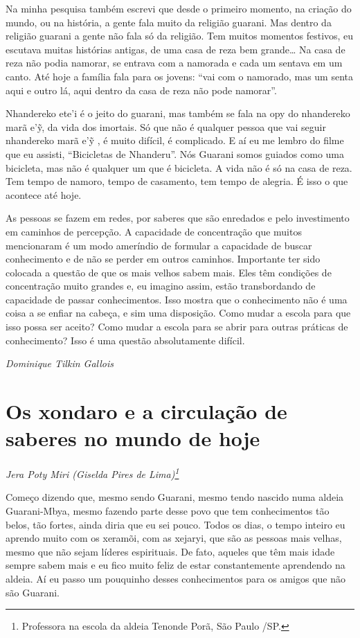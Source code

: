 Na minha pesquisa também escrevi que desde o primeiro momento, na
criação do mundo, ou na história, a gente fala muito da religião
guarani. Mas dentro da religião guarani a gente não fala só da
religião. Tem muitos momentos festivos, eu escutava muitas histórias
antigas, de uma casa de reza bem grande\ldots{} Na casa de reza não podia
namorar, se entrava com a namorada e cada um sentava em um canto. Até
hoje a família fala para os jovens: ``vai com o namorado, mas um senta
aqui e outro lá, aqui dentro da casa de reza não pode namorar''.

Nhandereko ete’i é o jeito do guarani, mas também se fala na opy do
nhandereko marã e’\~{y}, da vida dos imortais. Só que não é qualquer
pessoa que vai seguir nhandereko marã e’\~{y} , é muito difícil, é
complicado. E aí eu me lembro do filme que eu assisti, ``Bicicletas de
Nhanderu''. Nós Guarani somos guiados como uma bicicleta, mas não é
qualquer um que é bicicleta. A vida não é só na casa de reza. Tem tempo
de namoro, tempo de casamento, tem tempo de alegria. É isso o que
acontece até hoje.

As pessoas se fazem em redes, por saberes que são enredados e pelo
investimento em caminhos de percepção. A capacidade de concentração que
muitos mencionaram é um modo ameríndio de formular a capacidade de
buscar conhecimento e de não se perder em outros caminhos. Importante
ter sido colocada a questão de que os mais velhos sabem mais. Eles têm
condições de concentração muito grandes e, eu imagino assim, estão
transbordando de capacidade de passar conhecimentos. Isso mostra que o
conhecimento não é uma coisa a se enfiar na cabeça, e sim uma
disposição. Como mudar a escola para que isso possa ser aceito? Como
mudar a escola para se abrir para outras práticas de conhecimento? Isso
é uma questão absolutamente difícil.
\bigskip
\begin{flushright}
\emph{Dominique Tilkin Gallois}
\end{flushright}


\chapter{Os xondaro e a circulação de saberes no mundo de hoje}
\begin{flushright}
\emph{Jera Poty Miri (Giselda Pires de Lima)\footnote{Professora na escola da aldeia Tenonde Porã, São Paulo /SP.}}
\end{flushright}  

Começo dizendo que, mesmo sendo Guarani, mesmo tendo nascido numa aldeia
Guarani-Mbya, mesmo fazendo parte desse povo que tem conhecimentos tão
belos, tão fortes, ainda diria que eu sei pouco. Todos os dias, o tempo
inteiro eu aprendo muito com os xeramõi, com as xejaryi, que são as
pessoas mais velhas, mesmo que não sejam líderes espirituais. De fato,
aqueles que têm mais idade sempre sabem mais e eu fico muito feliz de
estar constantemente aprendendo na aldeia. Aí eu passo um pouquinho
desses conhecimentos para os amigos que não são Guarani.


